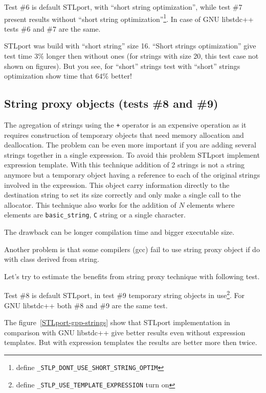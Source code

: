 \documentclass[a4paper]{article}
\providecommand{\STLport}{{\fontfamily{cmss}\selectfont STLport}}
\providecommand{\libstd}{{\fontfamily{cmtt}\selectfont GNU \mbox{libstdc++}}}
\begin{document}


Test \#6 is default \STLport{}, with ``short string optimization'', while
test \#7 present results without ``short string optimization''\footnote{define
\texttt{\_STLP\_DONT\_USE\_SHORT\_STRING\_OPTIM}}. In case of \libstd{}
tests \#6 and \#7 are the same.

\STLport{} was build with ``short string'' size 16. ``Short strings optimization'' give
test time $3\%$ longer then without ones (for strings with size 20, this test case
not shown on figures).
But you see, for ``short'' strings test with ``short'' strings optimization
show time that $64\%$ better!

\subsection{String proxy objects\label{add-string-proxy} (tests \#8 and \#9)}

The agregation of strings using the \verb|+| operator is an expensive operation
as it requires construction of temporary objects that need memory allocation
and deallocation. The problem can be even more important if you are adding
several strings together in a single expression. To avoid this problem \STLport{}
implement expression template. With this technique addition of 2 strings is not
a string anymore but a temporary object having a reference to each of the
original strings involved in the expression. This object carry information
directly to the destination string to set its size correctly and only make
a single call to the allocator. This technique also works for the addition of
$N$ elements where elements are \verb|basic_string|, \verb|C| string or a
single character.

The drawback can be longer compilation time and bigger executable size.

Another problem is that some compilers (gcc) fail to use string proxy object
if do with class derived from string.

Let's try to estimate the benefits from string proxy technique with following test.



Test \#8 is default \STLport{}, in test \#9 temporary string objects
in use\footnote{define \texttt{\_STLP\_USE\_TEMPLATE\_EXPRESSION} turn on}.
For \libstd{} both \#8 and \#9 are the same test.


The figure~\ref{STLport-gpp-strings} show that \STLport{} implementation
in comparison with \libstd{}
give better results even without expression templates. But with
expression templates the results are better more then twice.
\end{document}
